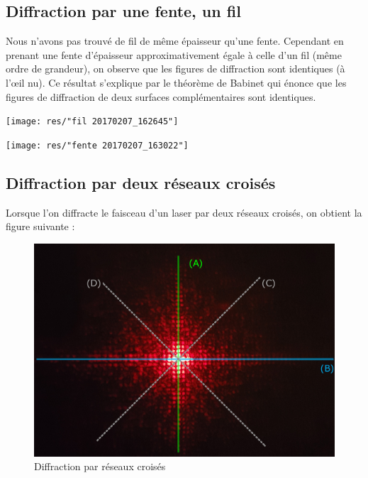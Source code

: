 \documentclass[12pt,a4paper]{article}
\begin{document}
	\subsection{Diffraction par une fente, un fil}
	Nous n'avons pas trouvé de fil de même épaisseur qu'une fente. Cependant en prenant une fente d'épaisseur approximativement égale à celle d'un fil (même ordre de grandeur), on observe que les figures de diffraction sont identiques (à l'œil nu).
	Ce résultat s'explique par le théorème de Babinet qui énonce que les figures de diffraction de deux surfaces complémentaires sont identiques.
	\begin{bigcenter}
		\begin{multicols}{2}
			\bgroup
			\texttt{[image: res/"fil 20170207\_162645"]}
			\egroup
			
			\columnbreak
			\vfill
			\bgroup
			\texttt{[image: res/"fente 20170207\_163022"]}
			\egroup
		\end{multicols}
	\end{bigcenter}
	
	\subsection{Diffraction par deux réseaux croisés}
	Lorsque l'on diffracte le faisceau d'un laser par deux réseaux croisés, on obtient la figure suivante :\\
	\begin{figure}[h]
		\centering
		\includegraphics[scale=0.08]{res/reseaux_axes}
		\caption{Diffraction par réseaux croisés}
	\end{figure}
	
\end{document}
